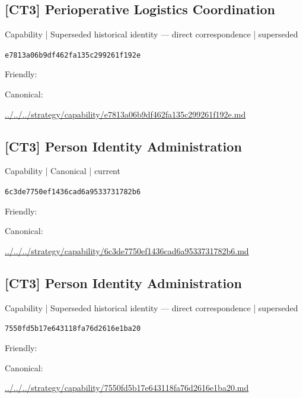 \documentclass[10pt,a4paper]{article}
\begin{document}
\subsection*{[CT3] Perioperative Logistics Coordination}
{\small Capability | Superseded historical identity — direct correspondence | superseded}\par
\texttt{e7813a06b9df462fa135c299261f192e}\par
Friendly: \par
Canonical: \par
{\footnotesize\url{../../../strategy/capability/e7813a06b9df462fa135c299261f192e.md}}\par
\subsection*{[CT3] Person Identity Administration}
{\small Capability | Canonical | current}\par
\texttt{6c3de7750ef1436cad6a9533731782b6}\par
Friendly: \par
Canonical: \par
{\footnotesize\url{../../../strategy/capability/6c3de7750ef1436cad6a9533731782b6.md}}\par
\subsection*{[CT3] Person Identity Administration}
{\small Capability | Superseded historical identity — direct correspondence | superseded}\par
\texttt{7550fd5b17e643118fa76d2616e1ba20}\par
Friendly: \par
Canonical: \par
{\footnotesize\url{../../../strategy/capability/7550fd5b17e643118fa76d2616e1ba20.md}}\par
\end{document}
